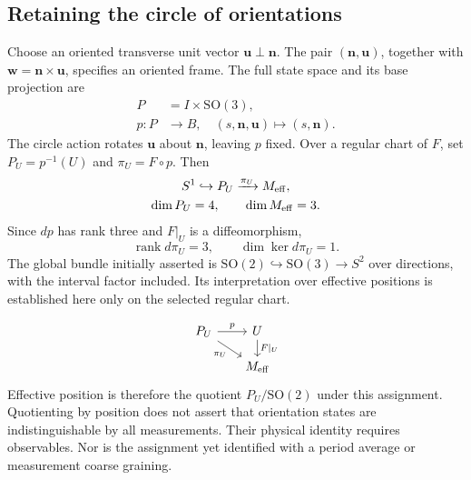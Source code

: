 \documentclass[11pt]{article}
\newcommand{\SO}{\mathrm{SO}}
\newcommand{\n}{\bm n}
\newcommand{\uu}{\bm u}
\newcommand{\ww}{\bm w}
\begin{document}
\subsection{Retaining the circle of orientations}

Choose an oriented transverse unit vector $\uu\perp\n$. The pair $(\n,\uu)$, together with $\ww=\n\times\uu$, specifies an oriented frame. The full state space and its base projection are
\begin{equation}
 \begin{aligned}
 P&=I\times\SO(3),\\
 p:P&\longrightarrow B,\quad(s,\n,\uu)\mapsto(s,\n).
 \end{aligned}
 \label{eq:P}
\end{equation}
The circle action rotates $\uu$ about $\n$, leaving $p$ fixed. Over a regular chart of $F$, set $P_U=p^{-1}(U)$ and $\pi_U=F\circ p$. Then
\begin{equation}
 \begin{gathered}
 S^1\hookrightarrow P_U\xrightarrow{\pi_U}M_{\rm eff},\\
 \dim P_U=4,\qquad\dim M_{\rm eff}=3.
 \end{gathered}
 \label{eq:bundle}
\end{equation}
Since $dp$ has rank three and $F|_U$ is a diffeomorphism,
\begin{equation}
 \operatorname{rank}d\pi_U=3,\qquad
 \dim\ker d\pi_U=1.
 \label{eq:rankpi}
\end{equation}
The global bundle initially asserted is $\SO(2)\hookrightarrow\SO(3)\to S^2$ over directions, with the interval factor included. Its interpretation over effective positions is established here only on the selected regular chart.

\begin{equation}
 \begin{tikzcd}[column sep=1.8em,row sep=1.2em]
 P_U\arrow[r,"p"]\arrow[dr,"\pi_U"']&U\arrow[d,"F|_U"]\\
 &M_{\rm eff}
 \end{tikzcd}
 \label{eq:diagram}
\end{equation}
Effective position is therefore the quotient $P_U/\SO(2)$ under this assignment. Quotienting by position does not assert that orientation states are indistinguishable by all measurements. Their physical identity requires observables. Nor is the assignment yet identified with a period average or measurement coarse graining.
\end{document}
